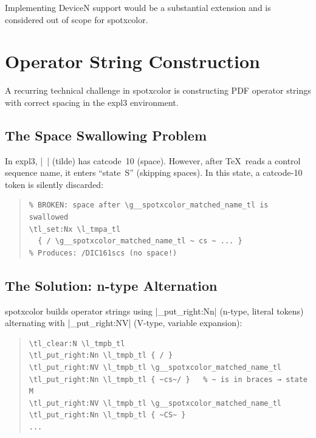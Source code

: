 \documentclass[luatex]{article}
\newcommand\pkg[1]{\textsf{#1}}
\begin{document}
Implementing DeviceN support would be a substantial extension
and is considered out of scope for \pkg{spotxcolor}.

\section{Operator String Construction}

A recurring technical challenge in \pkg{spotxcolor} is constructing PDF operator strings with correct spacing in the \pkg{expl3} environment.

\subsection{The Space Swallowing Problem}

In \pkg{expl3}, |~| (tilde) has catcode~10 (space).
However, after \TeX\ reads a control sequence name, it enters ``state~S'' (skipping spaces).
In this state, a catcode-10 token is silently discarded:

\begin{quote}
\begin{verbatim}
% BROKEN: space after \g__spotxcolor_matched_name_tl is swallowed
\tl_set:Nx \l_tmpa_tl
  { / \g__spotxcolor_matched_name_tl ~ cs ~ ... }
% Produces: /DIC161scs (no space!)
\end{verbatim}
\end{quote}

\subsection{The Solution: n-type Alternation}

\pkg{spotxcolor} builds operator strings using |\tl_put_right:Nn| (n-type, literal tokens) alternating with |\tl_put_right:NV| (V-type, variable expansion):

\begin{quote}
\begin{verbatim}
\tl_clear:N \l_tmpb_tl
\tl_put_right:Nn \l_tmpb_tl { / }
\tl_put_right:NV \l_tmpb_tl \g__spotxcolor_matched_name_tl
\tl_put_right:Nn \l_tmpb_tl { ~cs~/ }   % ~ is in braces → state M
\tl_put_right:NV \l_tmpb_tl \g__spotxcolor_matched_name_tl
\tl_put_right:Nn \l_tmpb_tl { ~CS~ }
...
\end{verbatim}
\end{quote}
\end{document}
